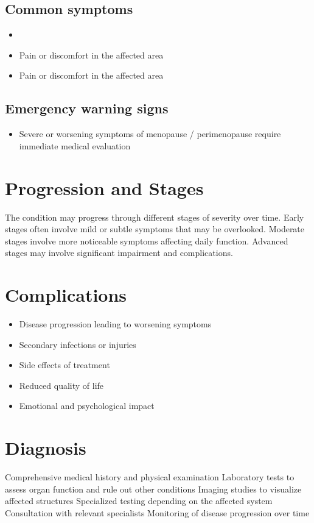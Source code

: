 \subsection{Common symptoms}
\begin{itemize}[noitemsep]
  \item \item Pain or discomfort in the affected area    \item Pain or discomfort in the affected area
  \end{itemize}

\subsection{Emergency warning signs}
\begin{itemize}[noitemsep]
  \item Severe or worsening symptoms of menopause / perimenopause require immediate medical evaluation
\end{itemize}
\section{Progression and Stages}
The condition may progress through different stages of severity over time. Early stages often involve mild or subtle symptoms that may be overlooked. Moderate stages involve more noticeable symptoms affecting daily function. Advanced stages may involve significant impairment and complications.
\section{Complications}
\begin{itemize}[noitemsep]
  \item Disease progression leading to worsening symptoms
  \item Secondary infections or injuries
  \item Side effects of treatment
  \item Reduced quality of life
  \item Emotional and psychological impact
\end{itemize}
\section{Diagnosis}
Comprehensive medical history and physical examination Laboratory tests to assess organ function and rule out other conditions Imaging studies to visualize affected structures Specialized testing depending on the affected system Consultation with relevant specialists Monitoring of disease progression over time

